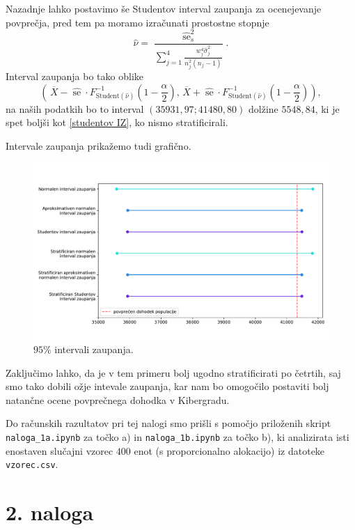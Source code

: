 \documentclass[a4paper,11pt]{article}
\newcommand{\olsi}[1]{\,\overline{\!{#1}}} %
\newcommand{\inv}{^{-1}}
\DeclareMathOperator{\se}{se}
\begin{document}
Nazadnje lahko postavimo še Studentov interval zaupanja za ocenejevanje povprečja, pred tem pa moramo izračunati prostostne stopnje
\[
    \hat{\nu} = \frac{\hat{\se}^2_s}{\sum_{j = 1}^4 \frac{w_j^4 \hat{\sigma}^2_j}{n_j^2 (n_j - 1)}}.  
\]
Interval zaupanja bo tako oblike
\[
    \left(\olsi{X} - \hat{\se} \cdot F_{\text{Student}(\hat{\nu})}\inv\left(1 - \frac{\alpha}{2}\right), 
    \olsi{X} + \hat{\se} \cdot F_{\text{Student}(\hat{\nu})}\inv\left(1 - \frac{\alpha}{2}\right)\right),  
\]
na naših podatkih bo to interval $\left(35931,97; 41480,80\right)$ dolžine $5548,84$, ki je spet boljši kot \eqref{studentov IZ}, ko nismo stratificirali.

Intervale zaupanja prikažemo tudi grafično.
\begin{figure}[h]
    \centering
    \includegraphics[width=\textwidth]{intervali_zaupanja.pdf}
    \caption{$95\%$ intervali zaupanja.}
\end{figure}

Zaključimo lahko, da je v tem primeru bolj ugodno stratificirati po četrtih, saj smo tako dobili ožje intevale zaupanja, kar nam bo omogočilo postaviti bolj natančne ocene povprečnega dohodka v Kibergradu. 

Do računskih razultatov pri tej nalogi smo prišli s pomočjo priloženih skript \texttt{naloga\_1a.ipynb} za točko a) in \texttt{naloga\_1b.ipynb} za točko b), ki analizirata isti enostaven slučajni vzorec $400$ enot (s proporcionalno alokacijo) iz datoteke \texttt{vzorec.csv}.

\section*{2. naloga}
\end{document}
